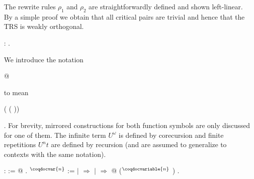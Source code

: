 The rewrite rules $\rho_1$ and $\rho_2$ are straightforwardly defined
and shown left-linear. By a simple proof we obtain that all critical
pairs are trivial and hence that the TRS is weakly orthogonal.
\begin{singlespace}
\begin{coqdoccode}
\coqdocnoindent
{}
 :
{}.\coqdoceol
\end{coqdoccode}
\end{singlespace}
We introduce the notation \begin{coqdoccode} @
  \end{coqdoccode} to mean
\begin{coqdoccode}
   ( 
  (
  ))\end{coqdoccode}. For
brevity, mirrored constructions for both function symbols are only
discussed for one of them. The infinite term $U^\omega$ is defined by
corecursion and finite repetitions $U^n t$ are defined by recursion
(and are assumed to generalize to contexts with the same notation).
\begin{singlespace}
\begin{coqdoccode}
\coqdocnoindent
{}
:  :=
 @
.\coqdoceol
\coqdocemptyline
\coqdocnoindent
{}
$^\coqdocvar{n}$
 :=\coqdoceol
\coqdocindent{1.00em}
  \coqdoceol
\coqdocindent{1.00em}
\ensuremath{|}
\ensuremath{\Rightarrow} \coqdoceol
\coqdocindent{1.00em}
\ensuremath{|}
 \ensuremath{\Rightarrow}
 @
($^\coqdocvariable{n}$
)\coqdoceol
\coqdocindent{1.00em}
.\coqdoceol
\end{coqdoccode}
\end{singlespace}

